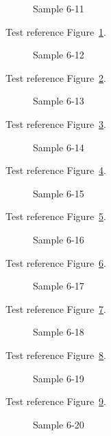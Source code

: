 \begin{figure}[tbhp]
\caption{Sample 6-11}
\label{fig:sample-6-11}
\end{figure}

Test reference Figure~\ref{fig:sample-6-11}.

\begin{figure}[tbhp]
\caption{Sample 6-12}
\label{fig:sample-6-12}
\end{figure}

Test reference Figure~\ref{fig:sample-6-12}.

\begin{figure}[tbhp]
\caption{Sample 6-13}
\label{fig:sample-6-13}
\end{figure}

Test reference Figure~\ref{fig:sample-6-13}.

\begin{figure}[tbhp]
\caption{Sample 6-14}
\label{fig:sample-6-14}
\end{figure}

Test reference Figure~\ref{fig:sample-6-14}.

\begin{figure}[tbhp]
\caption{Sample 6-15}
\label{fig:sample-6-15}
\end{figure}

Test reference Figure~\ref{fig:sample-6-15}.

\begin{figure}[tbhp]
\caption{Sample 6-16}
\label{fig:sample-6-16}
\end{figure}

Test reference Figure~\ref{fig:sample-6-16}.

\begin{figure}[tbhp]
\caption{Sample 6-17}
\label{fig:sample-6-17}
\end{figure}

Test reference Figure~\ref{fig:sample-6-17}.

\begin{figure}[tbhp]
\caption{Sample 6-18}
\label{fig:sample-6-18}
\end{figure}

Test reference Figure~\ref{fig:sample-6-18}.

\begin{figure}[tbhp]
\caption{Sample 6-19}
\label{fig:sample-6-19}
\end{figure}

Test reference Figure~\ref{fig:sample-6-19}.

\begin{figure}[tbhp]
\caption{Sample 6-20}
\label{fig:sample-6-20}
\end{figure}


